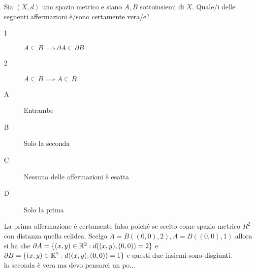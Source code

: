 \begin{exercise}
	Sia $(X,d)$ uno spazio metrico e siano $A, B$ sottoinsiemi di $X$. Quale/i delle seguenti affermazioni è/sono certamente vera/e?
	\begin{description}
		\item[1] $A\subseteq B \implies\partial A\subseteq \partial B$
		\item[2] $A\subseteq B \implies\overline{A}\subseteq\overline{B}$
	\end{description}
	\begin{description}
		\item[A] Entrambe
		\item[B] Solo la seconda
		\item[C] Nessuna delle affermazioni è esatta
		\item[D] Solo la prima
	\end{description}
	La prima affermazione è certamente falsa poiché se scelto come spazio metrico $R^2$ con distanza quella eclidea. Scelgo $A=B((0,0),2), A=B((0,0),1)$ allora si ha che $\partial A = \{(x,y)\in \mathbb{R}^2:d((x,y),(0,0))=2\}$ e $\partial B = \{(x,y)\in \mathbb{R}^2:d((x,y),(0,0))=1\}$ e questi due insiemi sono disgiunti.\\
	la seconda è vera ma devo pensarci un po...\\
\end{exercise}


